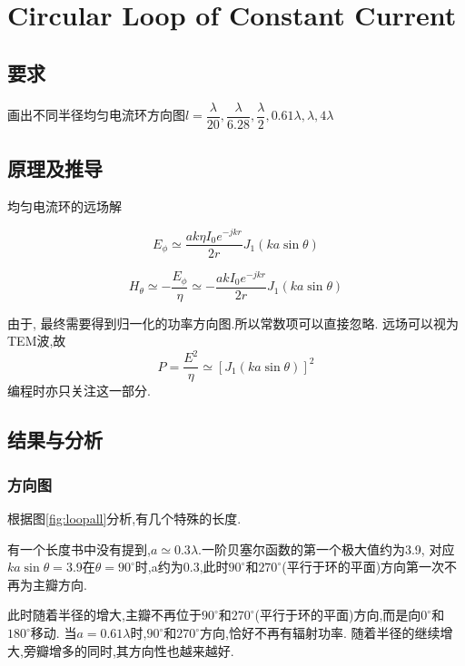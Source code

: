 

\section{Circular Loop  of Constant Current}
\subsection{要求}
\noindent 画出不同半径均匀电流环方向图$l=\dfrac{\lambda}{20},\dfrac{\lambda}{6.28},\dfrac{\lambda}{2},0.61\lambda,\lambda,4\lambda$ 

\subsection{原理及推导}
均匀电流环的远场解


\begin{equation}
E_\phi\simeq \dfrac{ak\eta I_0e^{-jkr}}{2r} J_1\left( ka\sin\theta\right)
\end{equation}


\begin{equation}
H_\theta\simeq -\dfrac{E_\phi}{\eta}
\simeq -\dfrac{ak I_0e^{-jkr}}{2r} J_1\left( ka\sin\theta\right)
\end{equation}

由于, 最终需要得到归一化的功率方向图.所以常数项可以直接忽略. 
远场可以视为TEM波,故
\begin{equation}
P=\dfrac{E^2}{\eta} \simeq \left[J_1\left( ka\sin\theta\right)\right]^2
\end{equation}
编程时亦只关注这一部分. 


\subsection{结果与分析}
\subsubsection{方向图}
根据图\ref{fig:loopall}分析,有几个特殊的长度.

有一个长度书中没有提到,$a\simeq0.3\lambda$.一阶贝塞尔函数的第一个极大值约为3.9, 对应$ka\sin\theta=3.9$在$\theta=90^\circ$时,a约为0.3,此时$90^\circ$和$270^\circ$(平行于环的平面)方向第一次不再为主瓣方向. 

此时随着半径的增大,主瓣不再位于$90^\circ$和$270^\circ$(平行于环的平面)方向,而是向$0^\circ $和$180^\circ $移动. 当$a=0.61\lambda$时,$90^\circ$和$270^\circ$方向,恰好不再有辐射功率. 随着半径的继续增大,旁瓣增多的同时,其方向性也越来越好.

